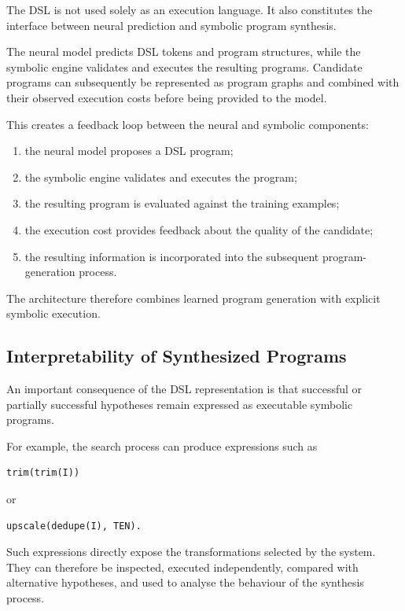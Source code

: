 \documentclass[final]{nesy2027}
\begin{document}
The DSL is not used solely as an execution language. It also constitutes the
interface between neural prediction and symbolic program synthesis.

The neural model predicts DSL tokens and program structures, while the
symbolic engine validates and executes the resulting programs. Candidate
programs can subsequently be represented as program graphs and combined with
their observed execution costs before being provided to the model.

This creates a feedback loop between the neural and symbolic components:

\begin{enumerate}
    \item the neural model proposes a DSL program;
    \item the symbolic engine validates and executes the program;
    \item the resulting program is evaluated against the training examples;
    \item the execution cost provides feedback about the quality of the
          candidate;
    \item the resulting information is incorporated into the subsequent
          program-generation process.
\end{enumerate}

The architecture therefore combines learned program generation with
explicit symbolic execution.

\subsection{Interpretability of Synthesized Programs}
\label{subsec:dsl-interpretability}

An important consequence of the DSL representation is that successful or
partially successful hypotheses remain expressed as executable symbolic
programs.

For example, the search process can produce expressions such as

\begin{verbatim}
trim(trim(I))
\end{verbatim}

or

\begin{verbatim}
upscale(dedupe(I), TEN).
\end{verbatim}

Such expressions directly expose the transformations selected by the system.
They can therefore be inspected, executed independently, compared with
alternative hypotheses, and used to analyse the behaviour of the synthesis
process.
\end{document}
